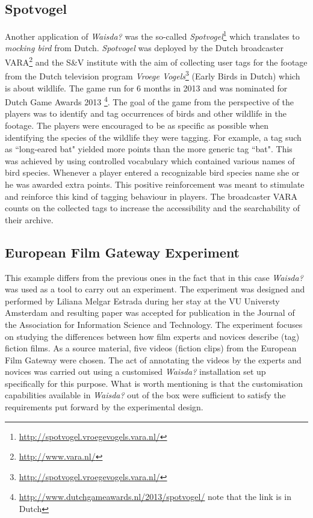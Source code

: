 \subsection{Spotvogel}\label{chap:waisda:spotvogel}
Another application of \textit{Waisda?} was the so-called \textit{Spotvogel}\footnote{\url{http://spotvogel.vroegevogels.vara.nl/}} which translates to \textit{mocking bird} from Dutch. \textit{Spotvogel} was deployed by the Dutch broadcaster VARA\footnote{\url{http://www.vara.nl/}} and the S\&V institute with the aim of collecting user tags for the footage from the Dutch television program \textit{Vroege Vogels}\footnote{\url{http://spotvogel.vroegevogels.vara.nl/}} (Early Birds in Dutch) which is about wildlife. The game run for 6 months in 2013 and was nominated for Dutch Game Awards 2013 \footnote{\url{http://www.dutchgameawards.nl/2013/spotvogel/} note that the link is in Dutch}. The goal of the game from the perspective of the players was to identify and tag occurrences of birds and other wildlife in the footage. The players were encouraged to be as specific as possible when identifying the species of the wildlife they were tagging. For example, a tag such as ``long-eared bat" yielded more points than the more generic tag ``bat". This was achieved by using controlled vocabulary which contained various names of bird species. Whenever a player entered a recognizable bird species name she or he was awarded extra points. This positive reinforcement was meant to stimulate and reinforce this kind of tagging behaviour in players. The broadcaster VARA counts on the collected tags to increase the accessibility and the searchability of their archive. 

\subsection{European Film Gateway Experiment}
This example differs from the previous ones in the fact that in this case \textit{Waisda?} was used as a tool to carry out an experiment. The experiment was designed and performed by Liliana Melgar Estrada during her stay at the VU Universty Amsterdam and resulting paper \cite{liliana} was accepted for publication in the Journal of the Association for Information Science and Technology. The experiment focuses on studying the differences between how film experts and novices describe (tag) fiction films. As a source material, five videos (fiction clips) from the European Film Gateway were chosen. The act of annotating the videos by the experts and novices was carried out using a customised \textit{Waisda?} installation set up specifically for this purpose. What is worth mentioning is that the customisation capabilities available in \textit{Waisda?} out of the box were sufficient to satisfy the requirements put forward by the experimental design.

